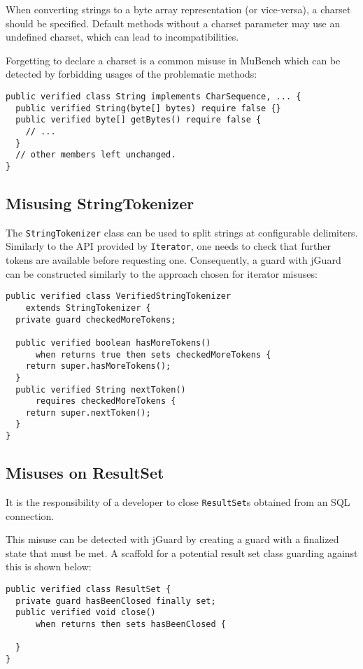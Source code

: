 \documentclass{article}
\begin{document}
When converting strings to a byte array representation (or vice-versa), a charset should
be specified.
Default methods without a charset parameter may use an undefined charset, which can lead
to incompatibilities.

Forgetting to declare a charset is a common misuse in MuBench which can be detected by
forbidding usages of the problematic methods:

\begin{lstlisting}[style=jGuard]
public verified class String implements CharSequence, ... {
  public verified String(byte[] bytes) require false {}
  public verified byte[] getBytes() require false {
    // ...
  }
  // other members left unchanged.
}
\end{lstlisting}

\subsection{Misusing StringTokenizer}

The \texttt{StringTokenizer} class can be used to split strings at configurable
delimiters.
Similarly to the API provided by \texttt{Iterator}, one needs to check that further
tokens are available before requesting one.
Consequently, a guard with jGuard can be constructed similarly to the approach
chosen for iterator misuses:

\begin{lstlisting}[style=jGuard]
public verified class VerifiedStringTokenizer 
    extends StringTokenizer {
  private guard checkedMoreTokens;

  public verified boolean hasMoreTokens()
      when returns true then sets checkedMoreTokens {
    return super.hasMoreTokens();
  }
  public verified String nextToken()
      requires checkedMoreTokens {
    return super.nextToken();
  }
}
\end{lstlisting}

\subsection{Misuses on ResultSet}

It is the responsibility of a developer to close \texttt{ResultSet}s obtained
from an SQL connection.

This misuse can be detected with jGuard by creating a guard with a finalized
state that must be met.
A scaffold for a potential result set class guarding against this is shown below:

\begin{lstlisting}[style=jGuard]
public verified class ResultSet {
  private guard hasBeenClosed finally set;
  public verified void close()
      when returns then sets hasBeenClosed {

  }
}
\end{lstlisting}
\end{document}
